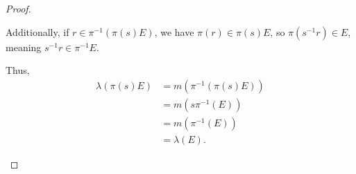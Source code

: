 \begin{proof}
\begin{enumerate}[(1)]
      Additionally, if $r\in \pi^{-1}\left(\pi(s)E\right)$, we have $\pi(r)\in \pi(s)E$, so $\pi\left(s^{-1}r\right)\in E$, meaning $s^{-1}r\in \pi^{-1}E$.\newline

      Thus,
      \begin{align*}
        \lambda\left(\pi\left(s\right)E\right) &= m\left(\pi^{-1}\left(\pi\left(s\right)E\right)\right)\\
                                               &= m\left(s\pi^{-1}\left(E\right)\right)\\
                                               &= m\left(\pi^{-1}\left(E\right)\right)\\
                                               &= \lambda\left(E\right).
      \end{align*}
  \end{enumerate}
\end{proof}

